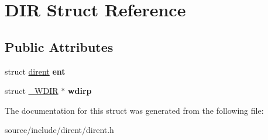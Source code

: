 \hypertarget{struct_d_i_r}{}\section{D\+I\+R Struct Reference}
\label{struct_d_i_r}
\subsection*{Public Attributes}
\begin{DoxyCompactItemize}
\item 
\hypertarget{struct_d_i_r_a59e9f5211cbb2f8e5b2807ccfdd2a7fc}{}struct \hyperlink{structdirent}{dirent} {\bfseries ent}\label{struct_d_i_r_a59e9f5211cbb2f8e5b2807ccfdd2a7fc}

\item 
\hypertarget{struct_d_i_r_a29362d4a3d7f809d0f5418b26cac5d41}{}struct \hyperlink{struct___w_d_i_r}{\+\_\+\+W\+D\+I\+R} $\ast$ {\bfseries wdirp}\label{struct_d_i_r_a29362d4a3d7f809d0f5418b26cac5d41}

\end{DoxyCompactItemize}


The documentation for this struct was generated from the following file\+:\begin{DoxyCompactItemize}
\item 
source/include/dirent/dirent.\+h\end{DoxyCompactItemize}
